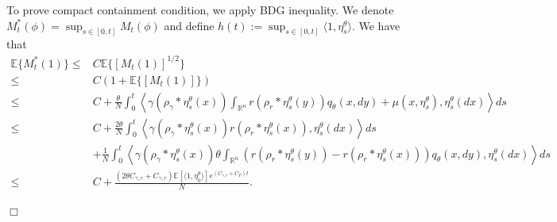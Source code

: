 \documentclass[12pt]{article}
\newenvironment {proof}{{\noindent\bf Proof }}{\hfill $\Box$ \medskip}
\begin{document}
\begin{proof}
To prove compact containment condition, we apply BDG inequality.
We denote $M^{*}_t(\phi)=\sup_{s \in [0,t]}M_t(\phi)$
and define $h(t):=\sup_{s \in [0,t]}\langle 1, \eta^{\theta}_{s} \rangle$.
We have that
\begin{equation}\label{eq: Control quadratic variation}
\begin{aligned}
\mathbb{E}\{M^{*}_t(1)\} \leq & C \mathbb{E}\{[M_t(1)]^{1/2}\}\\
\leq& C (1+\mathbb{E}\{[M_t(1)]\})\\
\leq & C+\frac{\theta}{N}\int_{0}^{t} \left\langle \gamma(\rho_{\gamma}*\eta^{\theta}_{s}(x))\int_{\mathbb{R}^n}r(\rho_{r}*\eta^{\theta}_{s}(y)) q_\theta(x,dy)+\mu(x,\eta^{\theta}_{s}), \eta^{\theta}_{s}(dx) \right\rangle ds \\
\leq & C+\frac{2\theta}{N}\int_{0}^{t} \left\langle \gamma(\rho_{\gamma}*\eta^{\theta}_{s}(x))r(\rho_{r}*\eta^{\theta}_{s}(x)), \eta^{\theta}_{s}(dx) \right\rangle ds \\
& + \frac{1}{N}\int_{0}^{t} \left\langle \gamma (\rho_{\gamma}*\eta^{\theta}_{s}(x))\theta\int_{\mathbb{R}^n}\left(r(\rho_{r}*\eta^{\theta}_{s}(y))-r(\rho_{r}*\eta^{\theta}_{s}(x))\right) q_\theta(x,dy), \eta^{\theta}_{s}(dx) \right\rangle ds\\
\leq & C+ \frac{(2 \theta C_{\gamma,r}+C_{\gamma,r})\mathbb{E}[\langle 1 ,\eta^{\theta}_{0}\rangle]e^{(C_{\gamma,r}+C_F)t}}{N}.
\end{aligned}
\end{equation}


\end{proof}
\end{document}
